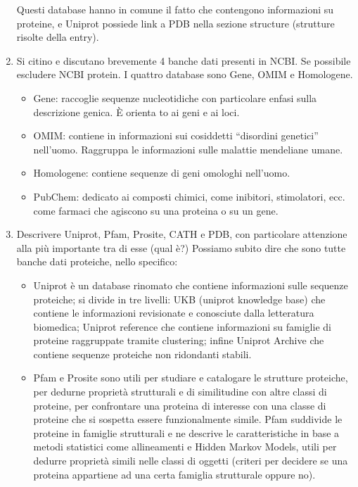 \documentclass{article}
\begin{document}
\begin{enumerate}
      Questi database hanno in comune il fatto che contengono informazioni su proteine, e Uniprot possiede link a PDB nella sezione structure (strutture risolte della entry). 
    \item Si citino e discutano brevemente 4 banche dati presenti in NCBI. Se possibile escludere NCBI protein.
      \subitem{-} I quattro database sono Gene, OMIM e Homologene.
      \begin{itemize}
         \item Gene: raccoglie sequenze nucleotidiche con particolare enfasi sulla descrizione genica. È orienta
         to ai geni e ai loci.
         \item OMIM: contiene in informazioni sui cosiddetti “disordini genetici” nell'uomo. Raggruppa le informazioni sulle malattie mendeliane umane.
         \item Homologene: contiene sequenze di geni omologhi nell'uomo. 
         \item PubChem: dedicato ai composti chimici, come inibitori, stimolatori, ecc. come farmaci che agiscono su una proteina o su un gene.
      \end{itemize}  
    \item  Descrivere Uniprot, Pfam, Prosite, CATH e PDB, con particolare attenzione alla più importante tra di esse (qual è?)
      \subitem{-} Possiamo subito dire che sono tutte banche dati proteiche, nello specifico:
         \begin{itemize}
            \item Uniprot è un database rinomato che contiene informazioni sulle sequenze proteiche; si divide in tre livelli: 
            UKB (uniprot knowledge base) che contiene le informazioni revisionate e conosciute dalla letteratura biomedica;	Uniprot reference che contiene informazioni su famiglie di proteine raggruppate tramite clustering; infine Uniprot Archive che contiene sequenze proteiche non ridondanti stabili.
            \item Pfam e Prosite sono utili per studiare e catalogare le strutture proteiche, per dedurne proprietà strutturali e di similitudine con altre classi di proteine, per confrontare una proteina di interesse con una classe di proteine che si sospetta essere funzionalmente simile. 
               \subitem Pfam suddivide le proteine in famiglie strutturali e ne descrive le caratteristiche in base a metodi statistici come allineamenti e Hidden Markov Models, utili per dedurre proprietà simili nelle classi di oggetti (criteri per decidere se una proteina appartiene ad una certa famiglia strutturale oppure no).

\end{itemize}
\end{enumerate}
\end{document}

